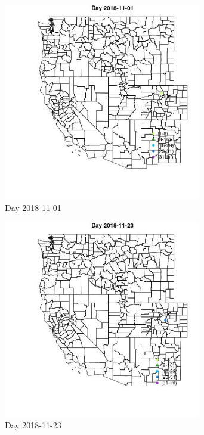 \begin{figure} 
\centering  
\includegraphics[width=0.77\textwidth]{Code_Outputs/Report_ML_input_PM25_Step4_part_e_de_duplicated_aves_MapObsDay2018-11-01.jpg} 
\caption{\label{fig:Report_ML_input_PM25_Step4_part_e_de_duplicated_avesMapObsDay2018-11-01}Day 2018-11-01} 
\end{figure} 
 

\begin{figure} 
\centering  
\includegraphics[width=0.77\textwidth]{Code_Outputs/Report_ML_input_PM25_Step4_part_e_de_duplicated_aves_MapObsDay2018-11-23.jpg} 
\caption{\label{fig:Report_ML_input_PM25_Step4_part_e_de_duplicated_avesMapObsDay2018-11-23}Day 2018-11-23} 
\end{figure} 
 

